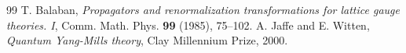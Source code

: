 \documentclass[11pt,a4paper]{article}
\theoremstyle{definition}
\begin{document}
\begin{thebibliography}{99}
 T. Balaban, \emph{Propagators and renormalization transformations for lattice gauge theories. I}, Comm. Math. Phys. \textbf{99} (1985), 75--102.
 A. Jaffe and E. Witten, \emph{Quantum Yang-Mills theory}, Clay Millennium Prize, 2000.
\end{thebibliography}
\end{document}
